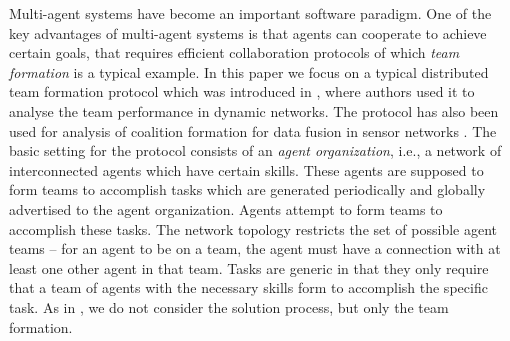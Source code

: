 \documentclass{llncs}
\begin{document}
Multi-agent systems have become an important software paradigm. One of the key advantages of multi-agent systems is that agents can cooperate to achieve certain goals, that requires efficient collaboration protocols of which \emph{team formation} is a typical example. In this paper we focus on a typical distributed team formation protocol which was introduced in \cite{gaston2005agent}, where authors used it to analyse the team performance in dynamic networks. The protocol %
has also been used for analysis of coalition formation for data fusion in sensor networks \cite{glinton2008agent}. The basic setting for the protocol consists of an \emph{agent organization}, i.e., a network of interconnected agents which have certain skills. These agents are supposed to form teams to accomplish tasks which are generated periodically and globally advertised to the agent organization. Agents attempt to form teams to accomplish these tasks. The network topology restricts the set of possible agent teams -- for an agent to be on a team, the agent must have a connection with at least one other agent in that team. Tasks are generic in that they only require that a team of agents with the necessary skills form to accomplish the specific task. As in \cite{gaston2005agent}, we do not consider the solution process, but only the team formation.
\end{document}
